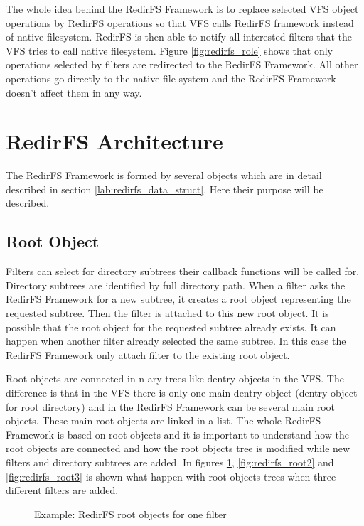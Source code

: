 The whole idea behind the RedirFS Framework is to replace selected VFS object operations
by RedirFS operations so that VFS calls RedirFS framework instead of native
filesystem. RedirFS is then able to notify all interested filters that the VFS tries to
call native filesystem. Figure \ref{fig:redirfs_role} shows that only operations
selected by filters are redirected to the RedirFS Framework. All other operations go
directly to the native file system and the RedirFS Framework doesn't affect them in any
way.

\section{RedirFS Architecture}
\label{lab:redirfs_arch}
The RedirFS Framework is formed by several objects which are in detail described in
section \ref{lab:redirfs_data_struct}. Here their purpose will be described.

\subsection{Root Object}
Filters can select for directory subtrees their callback functions will be
called for. Directory subtrees are identified by full directory path. When a
filter asks the
RedirFS Framework for a new subtree, it creates a root object representing
the requested subtree. Then the filter is attached to this new root object. It is
possible that the root object for the requested subtree already exists. It can happen when
another filter already selected the same subtree. In this case the RedirFS Framework only
attach filter to the existing root object.

Root objects are connected in n-ary trees like dentry objects in the VFS. The difference is
that in the VFS there is only one main dentry object (dentry object for root directory)
and in the RedirFS Framework can be several main root objects. These main root objects are
linked in a list. The whole RedirFS Framework is based on root objects and it is important to
understand how the root objects are connected and how the root objects tree is
modified while new filters and directory subtrees are added. In figures
\ref{fig:redirfs_root1}, \ref{fig:redirfs_root2} and \ref{fig:redirfs_root3} is shown
what happen with root objects trees when three different filters are added.

\begin{figure}[hp]
	\begin{center}
		
	\end{center}
	\caption{Example: RedirFS root objects for one filter}
	\label{fig:redirfs_root1}
\end{figure}


